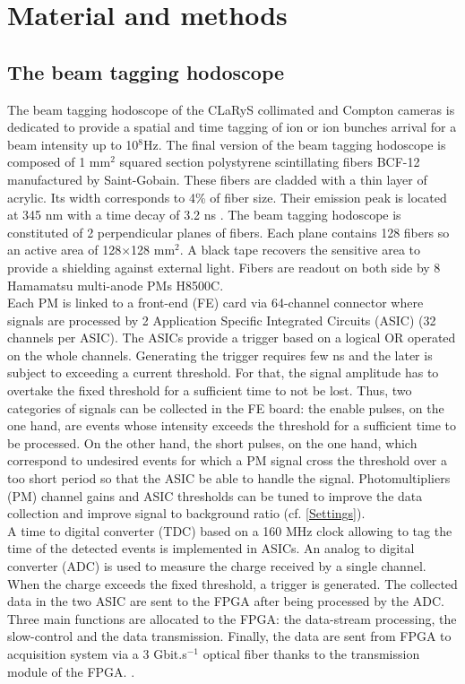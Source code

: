 \documentclass[a4paper,11pt]{article}
\begin{document}
\section{Material and methods}
\subsection{The beam tagging hodoscope}
The beam tagging hodoscope of the CLaRyS collimated and Compton cameras is dedicated to provide a spatial and time tagging of ion or ion bunches arrival for a beam intensity up to 10$^{8}$Hz.
The final version of the beam tagging hodoscope is composed  of 1 mm$^{2}$ squared section polystyrene scintillating fibers BCF-12 manufactured by Saint-Gobain. These fibers are cladded with a thin layer of acrylic. Its width corresponds to 4\% of fiber size. Their emission peak is located at 345 nm with a time decay of 3.2 ns \cite{SaintGobain2017}.
The beam tagging hodoscope is constituted of 2 perpendicular planes of fibers. Each plane contains 128 fibers so an active area of 128$\times$128 mm$^{2}$. A black tape recovers the sensitive area to provide a shielding against external light. Fibers are readout on both side by 8 Hamamatsu multi-anode PMs H8500C. \\

Each PM is linked to a front-end (FE) card via 64-channel connector where signals are processed by 2 Application Specific Integrated Circuits (ASIC) (32 channels per ASIC). The ASICs provide a trigger based on a logical OR operated on the whole channels. Generating the trigger requires few ns and the later is subject to exceeding a current threshold. For that, the signal amplitude has to overtake the fixed threshold for a sufficient time to not be lost. Thus, two categories of signals can be collected in the FE board: the enable pulses, on the one hand, are events whose intensity exceeds the threshold for a sufficient time to be processed. On the other hand, the short pulses, on the one hand, which correspond to undesired events for which a PM signal cross the threshold over a too short period so that the ASIC be able to handle the signal.
Photomultipliers (PM) channel gains and ASIC thresholds can be tuned to improve the data collection and improve signal to background ratio (cf. \ref{Settings}). \\

A time to digital converter (TDC) based on a 160 MHz clock allowing to tag the time of the detected events is implemented in ASICs. An analog to digital converter (ADC) is used to measure the charge received by a single channel. When the charge exceeds the fixed threshold, a trigger is generated. The collected data in the two ASIC are sent to the FPGA after being processed by the ADC. Three main functions are allocated to the FPGA: the data-stream processing, the slow-control and the data transmission. Finally, the data are sent from FPGA to acquisition system via a 3 Gbit.s$^{-1}$ optical fiber thanks to the transmission module of the FPGA. \cite{deng2013, Chen2017, Chen2019}. \\
\end{document}
